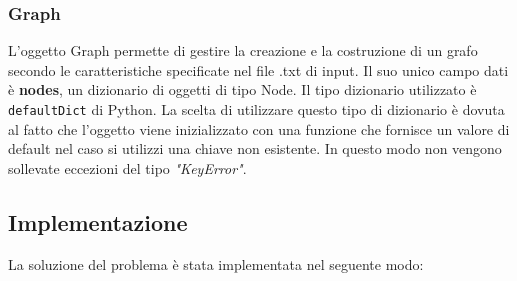\subsubsection{Graph}
L'oggetto Graph permette di gestire la creazione e la costruzione di un grafo secondo le caratteristiche specificate nel file .txt di input. Il suo unico campo dati è \textbf{nodes}, un dizionario di oggetti di tipo Node. Il tipo dizionario utilizzato è \texttt{defaultDict} di Python. La scelta di utilizzare questo tipo di dizionario è dovuta al fatto che l'oggetto viene inizializzato con una funzione che fornisce un valore di default nel caso si utilizzi una chiave non esistente. In questo modo non vengono sollevate eccezioni del tipo \emph{"KeyError"}.

\subsection{Implementazione}
La soluzione del problema è stata implementata nel seguente modo:
